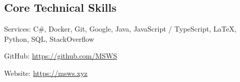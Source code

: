 \documentclass[10pt,letterpaper]{article}
\newenvironment{indentsection}[1]%
{\begin{list}{}%
	{\setlength{\leftmargin}{#1}}%
	\item[]%
}
{\end{list}}
\begin{document}
\subsection*{Core Technical Skills}

\begin{indentsection}{\parindent}
    \begin{description*}
        \item[Services:]
        C\#, Docker, Git, Google, Java, JavaScript / TypeScript, \LaTeX, Python, SQL, StackOverflow
        \item[GitHub:] \href{https://github.com/MSWS}{https://github.com/MSWS}
        \item[Website:] \href{https://msws.xyz}{https://msws.xyz}
    \end{description*}
\end{indentsection}
\end{document}
